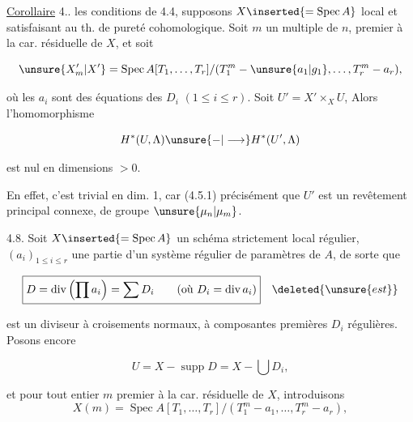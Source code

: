
\uline{Corollaire} 4..  les conditions de 4.4, supposons $X\inserted{=\operatorname{Spec} A}$  local et satisfaisant au th. de pureté cohomologique. Soit $m$ un  multiple de $n$, premier à la car. résiduelle de $X$, et soit

\[
\unsure{X'_m|X'}=\operatorname{Spec} A[T_1,\ldots,T_r]/(T_1^m-\unsure{a_1|g_1},\ldots,T_r^m-a_r),
\]

où  les $a_i$ sont des équations  des $D_i$ $(1\leq i\leq r)$. Soit $U'=X'\times_X U$, Alors l'homomorphisme 

\[
H^*(U,\Lambda)\unsure{{-}|\longrightarrow}H^*(U',\Lambda)
\]

est nul en dimensions $>0$.

En effet, c'est trivial en dim. 1, car (4.5.1)  précisément   que $U'$ est un revêtement  principal connexe, de groupe $\unsure{\mu_n|\mu_m}$.


4.8. Soit $X\inserted{=\operatorname{Spec} A}$ un schéma strictement local régulier, $(a_i)_{1\leq i\leq r}$ une partie d'un système régulier de paramètres de $A$, de sorte que  

\[
\boxed{D=\operatorname{div}\left(\prod a_i\right)=\sum D_i\qquad (\text{où }D_i=\operatorname{div}a_i)}\quad\deleted{\unsure{est}}
\]

est un diviseur à croisements normaux, à composantes premières $D_i$ régulières. Posons encore

\[
\boxed{U=X-\operatorname{supp}D=X-\bigcup D_i},
\]

 et pour tout entier $m$ premier à la car. résiduelle de $X$, introduisons
\[
X(m)=\operatorname{Spec}A[T_1,\ldots,T_r]/(T_1^m-a_1,\ldots,T_r^m-a_r),
\]
